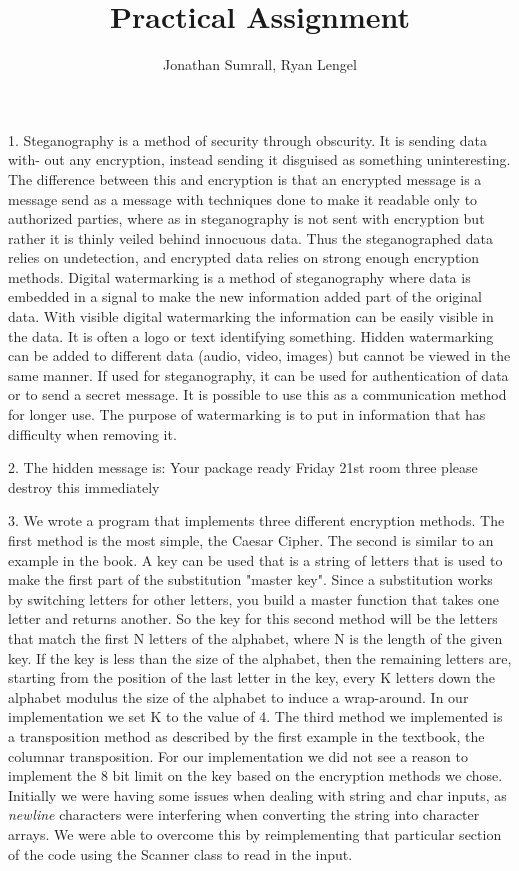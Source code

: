 \documentclass[]{apa}
\affiliation{1DV200}
\author{Jonathan Sumrall, Ryan Lengel}
\title{Practical Assignment}
\begin{document}
\doublespace
\maketitle{}

1. Steganography is a method of security through obscurity. It is sending data with-
out any encryption, instead sending it disguised as something uninteresting. The difference
between this and encryption is that an encrypted message is a message send as a message
with techniques done to make it readable only to authorized parties, where as in steganography is not sent with encryption but rather it is thinly veiled behind innocuous data. Thus the steganographed data relies on undetection, and encrypted data relies on strong enough
encryption methods. Digital watermarking is a method of steganography where data is
embedded in a signal to make the new information added part of the original data. With visible digital watermarking the information can be easily visible in the data. It is often a logo or text identifying something. Hidden watermarking can be added to different data (audio, video, images) but cannot be viewed in the same manner. If used for steganography, it can be used for authentication of data or to send a secret message. It is possible to use this as a communication method for longer use. The purpose of watermarking is to put in information that has difficulty when removing it. 


2. The hidden message is:
Your package ready Friday 21st room three please destroy this immediately 

3. We wrote a program that implements three different encryption methods. The first method is the most simple, the Caesar Cipher. The second is similar to an example in the book. A key can be used that is a string of letters that is used to make the first part of the substitution "master key".  Since a substitution works by switching letters for other letters, you build a master function that takes one letter and returns another. So the key for this second method will be the letters that match the first N letters of the alphabet, where N is the length of the given key. If the key is less than the size of the alphabet, then the remaining letters are, starting from the position of the last letter in the key, every K letters down the alphabet modulus the size of the alphabet to induce a wrap-around. In our implementation we set K to the value of 4. The third method we implemented is a transposition method as described by the first example in the textbook, the columnar transposition.  For our implementation we did not see a reason to implement the 8 bit limit on the key based on the encryption methods we chose. Initially we were having some issues when dealing with string and char inputs, as \emph{newline} characters were interfering when converting the string into character arrays. We were able to overcome this by reimplementing that particular section of the code using the Scanner class to read in the input.
\end{document}
